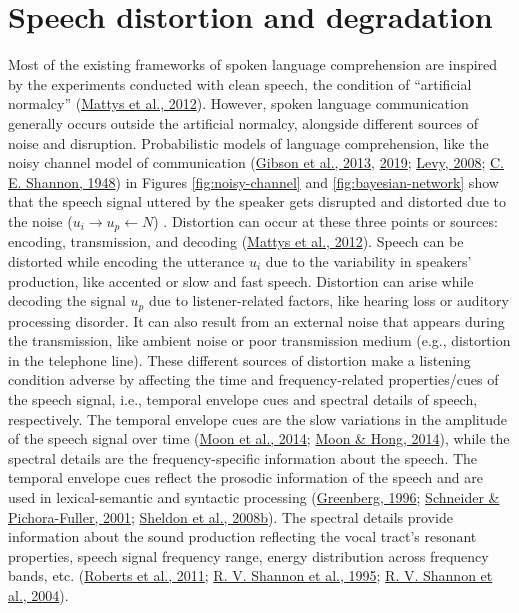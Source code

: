 \documentclass[a4paper, nobind]{templates/ociamthesis}
\begin{document}
\hypertarget{distortion-degradation}{%
\section{Speech distortion and degradation}\label{distortion-degradation}}

Most of the existing frameworks of spoken language comprehension are inspired by the experiments conducted with clean speech,
the condition of ``artificial normalcy'' (\protect\hyperlink{ref-Mattys2012}{Mattys et al., 2012}).
However, spoken language communication generally occurs outside the artificial normalcy, alongside different sources of noise and disruption.
Probabilistic models of language comprehension, like the noisy channel model of communication (\protect\hyperlink{ref-Gibson2013}{Gibson et al., 2013}, \protect\hyperlink{ref-Gibson2019}{2019}; \protect\hyperlink{ref-Levy2008}{Levy, 2008}; \protect\hyperlink{ref-Shannon1948}{C. E. Shannon, 1948}) in Figures \ref{fig:noisy-channel} and \ref{fig:bayesian-network} show that the speech signal uttered by the speaker gets disrupted and distorted due to the noise (\(u_i\rightarrow u_p\leftarrow N\)) .
Distortion can occur at these three points or sources: encoding, transmission, and decoding (\protect\hyperlink{ref-Mattys2012}{Mattys et al., 2012}).
Speech can be distorted while encoding the utterance \(u_i\) due to the variability in speakers' production, like accented or slow and fast speech.
Distortion can arise while decoding the signal \(u_p\) due to listener-related factors, like hearing loss or auditory processing disorder.
It can also result from an external noise that appears during the transmission, like ambient noise or poor transmission medium (e.g., distortion in the telephone line).
These different sources of distortion make a listening condition adverse by affecting the time and frequency-related properties/cues of the speech signal, i.e., temporal envelope cues and spectral details of speech, respectively.
The temporal envelope cues are the slow variations in the amplitude of the speech signal over time (\protect\hyperlink{ref-Moon2014}{Moon et al., 2014}; \protect\hyperlink{ref-Moon2014a}{Moon \& Hong, 2014}), while the spectral details are the frequency-specific information about the speech.
The temporal envelope cues reflect the prosodic information of the speech and are used in lexical-semantic and syntactic processing (\protect\hyperlink{ref-Greenberg1996}{Greenberg, 1996}; \protect\hyperlink{ref-Schneider2001}{Schneider \& Pichora-Fuller, 2001}; \protect\hyperlink{ref-Sheldon2008b}{Sheldon et al., 2008b}).
The spectral details provide information about the sound production reflecting the vocal tract's resonant properties, speech signal frequency range, energy distribution across frequency bands, etc. (\protect\hyperlink{ref-Roberts2011}{Roberts et al., 2011}; \protect\hyperlink{ref-Shannon1995}{R. V. Shannon et al., 1995}; \protect\hyperlink{ref-Shannon2004}{R. V. Shannon et al., 2004}).
\end{document}
